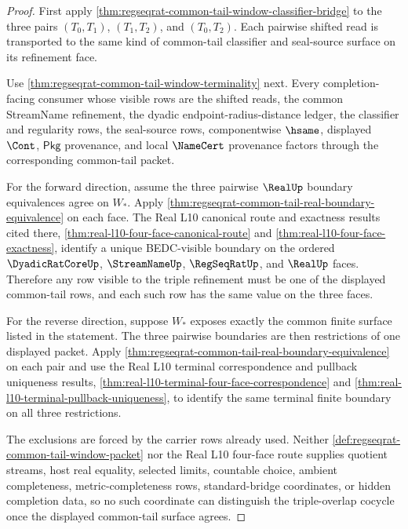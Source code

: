 \begin{proof}
First apply \autoref{thm:regseqrat-common-tail-window-classifier-bridge} to the three pairs $(T_0,T_1)$, $(T_1,T_2)$, and $(T_0,T_2)$. Each pairwise shifted read is transported to the same kind of common-tail classifier and seal-source surface on its refinement face.

Use \autoref{thm:regseqrat-common-tail-window-terminality} next. Every completion-facing consumer whose visible rows are the shifted reads, the common StreamName refinement, the dyadic endpoint-radius-distance ledger, the classifier and regularity rows, the seal-source rows, componentwise $\hsame$, displayed $\Cont$, $\mathsf{Pkg}$ provenance, and local $\NameCert$ provenance factors through the corresponding common-tail packet.

For the forward direction, assume the three pairwise $\RealUp$ boundary equivalences agree on $W_\ast$. Apply \autoref{thm:regseqrat-common-tail-real-boundary-equivalence} on each face. The Real L10 canonical route and exactness results cited there, \autoref{thm:real-l10-four-face-canonical-route} and \autoref{thm:real-l10-four-face-exactness}, identify a unique BEDC-visible boundary on the ordered $\DyadicRatCoreUp$, $\StreamNameUp$, $\RegSeqRatUp$, and $\RealUp$ faces. Therefore any row visible to the triple refinement must be one of the displayed common-tail rows, and each such row has the same value on the three faces.

For the reverse direction, suppose $W_\ast$ exposes exactly the common finite surface listed in the statement. The three pairwise boundaries are then restrictions of one displayed packet. Apply \autoref{thm:regseqrat-common-tail-real-boundary-equivalence} on each pair and use the Real L10 terminal correspondence and pullback uniqueness results, \autoref{thm:real-l10-terminal-four-face-correspondence} and \autoref{thm:real-l10-terminal-pullback-uniqueness}, to identify the same terminal finite boundary on all three restrictions.

The exclusions are forced by the carrier rows already used. Neither \autoref{def:regseqrat-common-tail-window-packet} nor the Real L10 four-face route supplies quotient streams, host real equality, selected limits, countable choice, ambient completeness, metric-completeness rows, standard-bridge coordinates, or hidden completion data, so no such coordinate can distinguish the triple-overlap cocycle once the displayed common-tail surface agrees.
\end{proof}

